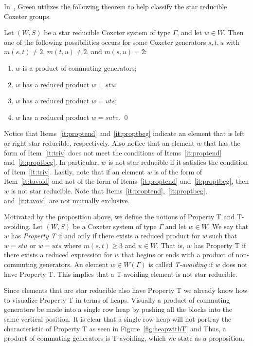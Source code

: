 In~\cite{Green2006a}, Green utilizes the following theorem to help classify the star reducible Coxeter groups. 
\begin{proposition}\label{thm:starred}
	Let $(W,S)$ be a star reducible Coxeter system of type $\Gamma$, and let $w \in W$. Then one of the following possibilities occurs for some Coxeter generators $s,t, u$ with $m(s,t) \neq 2$, $m(t,u) \neq 2$, and $m(s,u)=2$:
	\begin{enumerate}[leftmargin=2cm]
	\item $w$ is a product of commuting generators;\label{it:triv}
	\item $w$ has a reduced product $w=stu$;\label{it:proptend}
	\item $w$ has a reduced product $w=uts$;\label{it:proptbeg}
	\item $w$ has a reduced product $w=sutv$.\label{it:tavoid}	\qed
	\end{enumerate}
\end{proposition}

Notice that Items~\ref{it:proptend} and~\ref{it:proptbeg} indicate an element that is left or right star reducible, respectively. Also notice that an element $w$ that has the form of Item~\ref{it:triv} does not meet the conditions of Items~\ref{it:proptend} and~\ref{it:proptbeg}. In particular, $w$ is not star reducible if it satisfies the condition of Item~\ref{it:triv}. Lastly, note that if an element $w$ is of the form of Item~\ref{it:tavoid} and not of the form of Items~\ref{it:proptend} and~\ref{it:proptbeg}, then $w$ is not star reducible. Note that Items~\ref{it:proptend},~\ref{it:proptbeg}, and~\ref{it:tavoid} are not mutually exclusive.

Motivated by the proposition above, we define the notions of Property T and T-avoiding. Let $(W,S)$ be a Coxeter system of type $\Gamma$ and let $w \in W$. We say that $w$ has \emph{Property T} if and only if there exists a reduced product for $w$ such that $w=stu$ or $w=uts$ where $m(s,t)\geq 3$ and $u \in W$. That is, $w$ has Property T if there exists a reduced expression for $w$ that begins or ends with a product of non-commuting generators. An element $w \in W(\Gamma)$ is called \emph{T-avoiding} if $w$ does not have Property T. This implies that a T-avoiding element is not star reducible.

 Since elements that are star reducible also have Property T we already know how to visualize Property T in terms of heaps. Visually a product of commuting generators be made into a single row heap by pushing all the blocks into the same vertical position. It is clear that a single row heap will not portray the characteristic of Property T as seen in Figure~\ref{fig:heapwithT} and Thus, a product of commuting generators is T-avoiding, which we state as a proposition.


